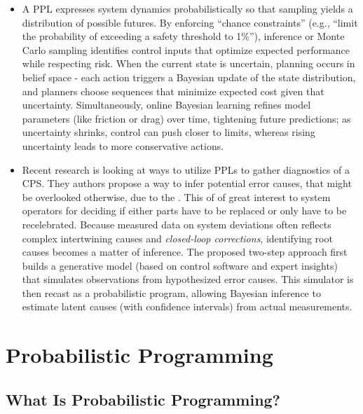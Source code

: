 \begin{multicols}{2}
\begin{itemize}
  \item A PPL expresses system dynamics probabilistically so that sampling yields a distribution of possible futures. \cite{cpsPredictiveControl} By enforcing “chance constraints”
  (e.g., “limit the probability of exceeding a safety threshold to 1\%”), inference or Monte Carlo sampling identifies control inputs that optimize expected performance while
  respecting risk. When the current state is uncertain, planning occurs in belief space - each action triggers a Bayesian update of the state distribution, and planners
  choose sequences that minimize expected cost given that uncertainty. Simultaneously, online Bayesian learning refines model parameters (like friction or drag) over time,
  tightening future predictions; as uncertainty shrinks, control can push closer to limits, whereas rising uncertainty leads to more conservative actions.
  
  \item Recent research is looking at ways to utilize PPLs to gather diagnostics of a CPS. \cite{cpsPPLDiagnostics} They authors propose a way to infer potential error causes, that
  might be overlooked otherwise, due to the .
  This of of great interest to system operators for deciding if either parts have to be replaced or only have to be recelebrated. Because measured data on system deviations
  often reflects complex intertwining causes and \textit{closed-loop corrections}, identifying root causes becomes a matter of inference. The proposed two-step approach
  first builds a generative model (based on control software and expert insights) that simulates observations from hypothesized error causes. This simulator is then recast
  as a probabilistic program, allowing Bayesian inference to estimate latent causes (with confidence intervals) from actual measurements.

  \end{itemize}
\end{multicols}

\label{sec:pp}
\chapter{Probabilistic Programming}
\section{What Is Probabilistic Programming?}

